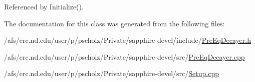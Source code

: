 Referenced by Initialize().



The documentation for this class was generated from the following files\-:\begin{DoxyCompactItemize}
\item 
/afs/crc.\-nd.\-edu/user/p/pscholz/\-Private/sapphire-\/devel/include/\hyperlink{PreEqDecayer_8h}{Pre\-Eq\-Decayer.\-h}\item 
/afs/crc.\-nd.\-edu/user/p/pscholz/\-Private/sapphire-\/devel/src/\hyperlink{PreEqDecayer_8cpp}{Pre\-Eq\-Decayer.\-cpp}\item 
/afs/crc.\-nd.\-edu/user/p/pscholz/\-Private/sapphire-\/devel/src/\hyperlink{Setup_8cpp}{Setup.\-cpp}\end{DoxyCompactItemize}
